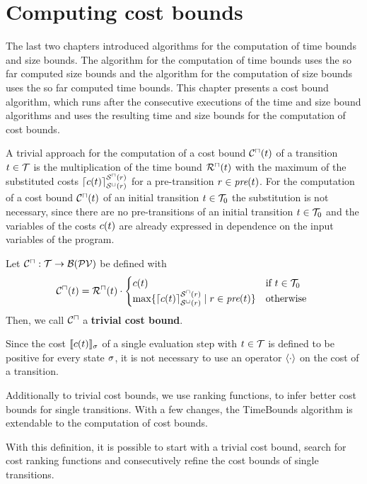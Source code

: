 \section{Computing cost bounds}

The last two chapters introduced algorithms for the computation of time bounds and size bounds.
The algorithm for the computation of time bounds uses the so far computed size bounds and the algorithm for the computation of size bounds uses the so far computed time bounds.
This chapter presents a cost bound algorithm, which runs after the consecutive executions of the time and size bound algorithms and uses the resulting time and size bounds for the computation of cost bounds.

A trivial approach for the computation of a cost bound ${\mathcal{C}^\sqcap}(t)$ of a transition $t \in \mathcal{T}$ is the multiplication of the time bound ${\mathcal{R}^\sqcap}(t)$ with the maximum of the substituted costs $\lceil c(t) \rceil^{{\mathcal{S}^\sqcap}(r)}_{{\mathcal{S}^\sqcup}(r)}$ for a pre-transition $r \in \emph{pre}(t)$.
For the computation of a cost bound ${\mathcal{C}^\sqcap}(t)$ of an initial transition $t \in \mathcal{T}_0$ the substitution is not necessary, since there are no pre-transitions of an initial transition $t \in \mathcal{T}_0$ and the variables of the costs $c(t)$ are already expressed in dependence on the input variables of the program.

\begin{definition}
  Let ${\mathcal{C}^\sqcap}: \mathcal{T} \rightarrow \mathcal{B}(\mathcal{PV})$ be defined with
  \[ {\mathcal{C}^\sqcap}(t) = {\mathcal{R}^\sqcap}(t) \cdot
  \begin{cases}
    c(t) & \text{if } t \in \mathcal{T}_0 \\
    \max \lbrace \lceil c(t) \rceil^{{\mathcal{S}^\sqcap}(r)}_{{\mathcal{S}^\sqcup}(r)} \mid r \in \emph{pre}(t) \rbrace & \text{otherwise }
  \end{cases}
  \]
  Then, we call ${\mathcal{C}^\sqcap}$ a \textbf{trivial cost bound}. 
\end{definition}

Since the cost $\llbracket c(t) \rrbracket_{\sigma}$ of a single evaluation step with $t \in \mathcal{T}$ is defined to be positive for every state $\sigma$, it is not necessary to use an operator $\langle\cdot\rangle$ on the cost of a transition.

\begin{example}

\end{example}

Additionally to trivial cost bounds, we use ranking functions, to infer better cost bounds for single transitions.
With a few changes, the TimeBounds algorithm is extendable to the computation of cost bounds.



With this definition, it is possible to start with a trivial cost bound, search for cost ranking functions and consecutively refine the cost bounds of single transitions.
